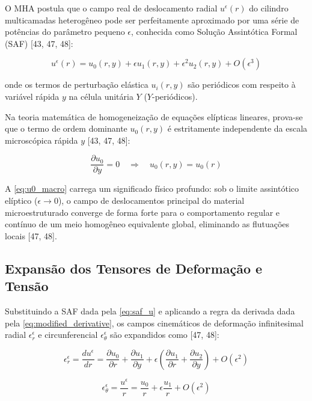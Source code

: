 O MHA postula que o campo real de deslocamento radial $u^\epsilon(r)$ do cilindro multicamadas heterogêneo pode ser perfeitamente aproximado por uma série de potências do parâmetro pequeno $\epsilon$, conhecida como Solução Assintótica Formal (SAF) [43, 47, 48]:

\begin{equation}
  u^\epsilon (r) = u_0(r, y) + \epsilon u_1(r, y) + \epsilon^2 u_2(r, y) + O(\epsilon^3)
  \label{eq:saf_u}
\end{equation}

onde os termos de perturbação elástica $u_i (r, y)$ são periódicos com respeito à variável rápida $y$ na célula unitária $Y$ ($Y$-periódicos).

Na teoria matemática de homogeneização de equações elípticas lineares, prova-se que o termo de ordem dominante $u_0(r, y)$ é estritamente independente da escala microscópica rápida $y$ [43, 47, 48]:

\begin{equation}
  \frac{\partial u_0}{\partial y} = 0 \quad \Longrightarrow \quad u_0(r, y) = u_0(r)
  \label{eq:u0_macro}
\end{equation}

A \eqref{eq:u0_macro} carrega um significado físico profundo: sob o limite assintótico elíptico ($\epsilon \to 0$), o campo de deslocamentos principal do material microestruturado converge de forma forte para o comportamento regular e contínuo de um meio homogêneo equivalente global, eliminando as flutuações locais [47, 48].

\subsection{Expansão dos Tensores de Deformação e Tensão}

Substituindo a SAF dada pela \eqref{eq:saf_u} e aplicando a regra da derivada dada pela \eqref{eq:modified_derivative}, os campos cinemáticos de deformação infinitesimal radial $\epsilon_r^\epsilon$ e circunferencial $\epsilon_\theta^\epsilon$ são expandidos como [47, 48]:

\begin{equation}
  \epsilon_r^\epsilon = \frac{d u^\epsilon}{d r} = \frac{\partial u_0}{\partial r} + \frac{\partial u_1}{\partial y} + \epsilon \left( \frac{\partial u_1}{\partial r} + \frac{\partial u_2}{\partial y} \right) + O(\epsilon^2)
  \label{eq:deform_r}
\end{equation}

\begin{equation}
  \epsilon_\theta^\epsilon = \frac{u^\epsilon}{r} = \frac{u_0}{r} + \epsilon \frac{u_1}{r} + O(\epsilon^2)
  \label{eq:deform_theta}
\end{equation}


